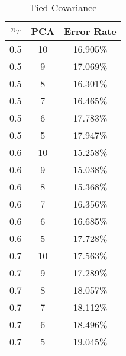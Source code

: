 \begin{center}
\begin{longtable}{|c|c|c|}
\caption{Tied Covariance}\label{tab:mvg_tiedcov}\\
\hline
$\pi_T$ & PCA & Error Rate\\
\hline
0.5 & 10 & 16.905\% \\
\hline
0.5 & 9 & 17.069\% \\
\hline
0.5 & 8 & 16.301\% \\
\hline
0.5 & 7 & 16.465\% \\
\hline
0.5 & 6 & 17.783\% \\
\hline
0.5 & 5 & 17.947\% \\
\hline
0.6 & 10 & 15.258\% \\
\hline
0.6 & 9 & 15.038\% \\
\hline
0.6 & 8 & 15.368\% \\
\hline
0.6 & 7 & 16.356\% \\
\hline
0.6 & 6 & 16.685\% \\
\hline
0.6 & 5 & 17.728\% \\
\hline
0.7 & 10 & 17.563\% \\
\hline
0.7 & 9 & 17.289\% \\
\hline
0.7 & 8 & 18.057\% \\
\hline
0.7 & 7 & 18.112\% \\
\hline
0.7 & 6 & 18.496\% \\
\hline
0.7 & 5 & 19.045\% \\
\hline
\hline
\end{longtable}
\end{center}
